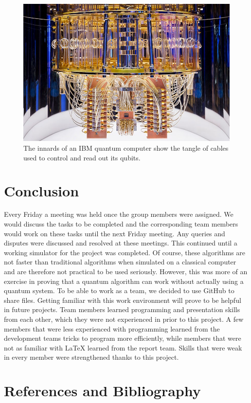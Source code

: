 \documentclass{article}
\begin{document}
\begin{figure}[H]
\includegraphics[width=16cm]{docs/images/IBM.jpg}
\caption{The innards of an IBM quantum computer show the tangle of cables used to control and read out its qubits. \cite{ball_first_2021}}
\end{figure}


\pagebreak

\section{Conclusion} %

Every Friday a meeting was held once the group members were assigned. We would discuss the tasks to be completed and the corresponding team members would work on these tasks until the next Friday meeting. Any queries and disputes were discussed and resolved at these meetings. This continued until a working simulator for the project was completed. Of course, these algorithms are not faster than traditional algorithms when simulated on a classical computer and are therefore not practical to be used seriously. However, this was more of an exercise in proving that a quantum algorithm can work without actually using a quantum system. To be able to work as a team, we decided to use GitHub to share files. Getting familiar with this work environment will prove to be helpful in future projects. Team members learned programming and presentation skills from each other, which they were not experienced in prior to this project. A few members that were less experienced with programming learned from the development teams tricks to program more efficiently, while members that were not as familiar with \LaTeX{} learned from the report team. Skills that were weak in every member were strengthened thanks to this project.


\section{References and Bibliography}
\printbibliography[heading=none]
\end{document}

